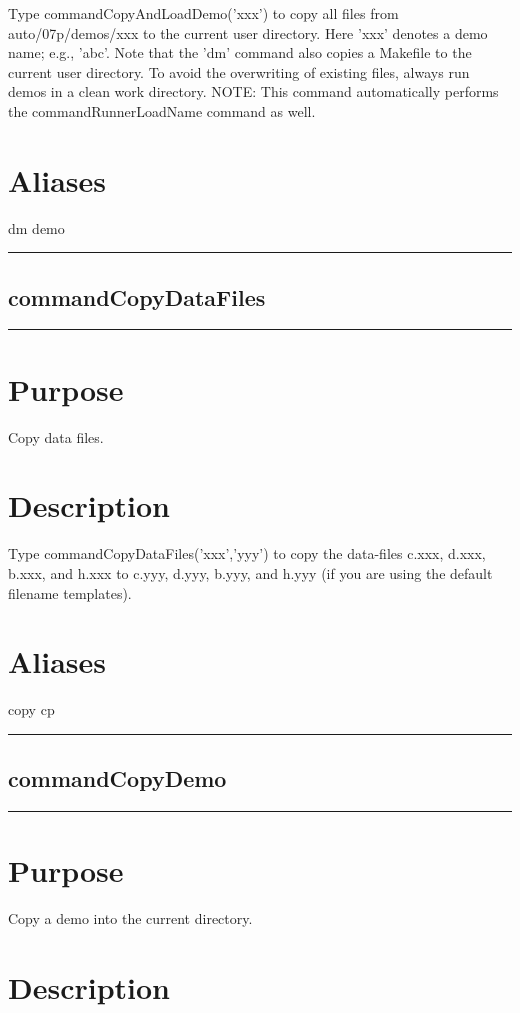 \documentclass[12pt]{report}
\begin{document}
\begin{minipage}{6in}
    Type commandCopyAndLoadDemo('xxx') to copy all files from auto/07p/demos/xxx to the
    current user directory.  Here 'xxx' denotes a demo name; e.g.,
    'abc'.  Note that the 'dm' command also copies a Makefile to the
    current user directory. To avoid the overwriting of existing
    files, always run demos in a clean work directory.  NOTE: This
    command automatically performs the commandRunnerLoadName command
    as well.
    \section*{Aliases}
dm demo \medskip\hrule\end{minipage}\subsection{commandCopyDataFiles} \label{sec:clui_ref_commandCopyDataFiles}\begin{minipage}{6in}\hrule\medskip\section*{Purpose}
Copy data files.\section*{Description}

    Type commandCopyDataFiles('xxx','yyy') to copy the data-files c.xxx, d.xxx, b.xxx,
    and h.xxx to c.yyy, d.yyy, b.yyy, and h.yyy (if you are using the
    default filename templates).
    \section*{Aliases}
copy cp \medskip\hrule\end{minipage}\subsection{commandCopyDemo} \label{sec:clui_ref_commandCopyDemo}\begin{minipage}{6in}\hrule\medskip\section*{Purpose}
Copy a demo into the current directory.\section*{Description}


\end{minipage}
\end{document}
